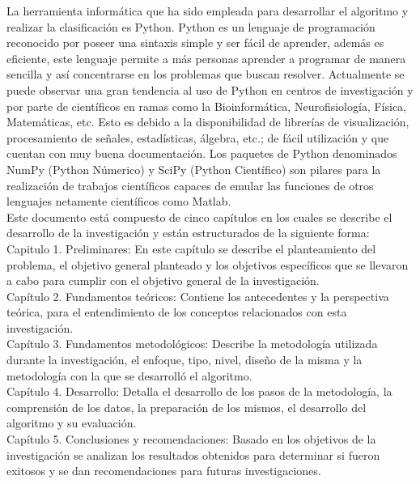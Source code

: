 La herramienta informática que ha sido empleada para desarrollar el algoritmo y realizar
la clasificación es Python. Python es un lenguaje de programación reconocido por poseer
una sintaxis simple y ser fácil de aprender, además es eficiente, este lenguaje permite
 a más personas aprender a programar de manera sencilla y así concentrarse en los
 problemas que buscan resolver. Actualmente se puede observar una gran tendencia al
 uso de Python en  centros de investigación y por parte de científicos en ramas como la Bioinformática,
  Neurofisiología, Física, Matemáticas, etc. Esto es debido a la disponibilidad de
  librerías de visualización, procesamiento de señales, estadísticas, álgebra, etc.;
  de fácil utilización y que cuentan con muy buena documentación. Los paquetes de
  Python denominados NumPy (Python Númerico) y SciPy (Python Científico) son pilares
  para la realización de trabajos científicos capaces de emular las funciones de otros
  lenguajes netamente científicos como Matlab.\\

Este documento está compuesto de cinco capítulos en los cuales se describe el desarrollo  de la
investigación y están estructurados de la siguiente forma:\\

Capitulo 1. Preliminares: En este capítulo se describe el planteamiento del problema,
el objetivo general planteado y los objetivos específicos que se llevaron a cabo para cumplir con el
objetivo general de  la investigación.\\

Capítulo 2. Fundamentos teóricos: Contiene los antecedentes y la perspectiva teórica, para el
entendimiento de los conceptos relacionados con esta investigación.\\

Capítulo 3. Fundamentos metodológicos: Describe la metodología utilizada durante la investigación, el
enfoque, tipo, nivel, dise\~no de la misma y la metodología con la que se desarrolló el algoritmo.\\

Capítulo 4. Desarrollo: Detalla el desarrollo de los pasos de la metodología, la
comprensión de los datos, la preparación de los mismos, el desarrollo del algoritmo y su
evaluación.\\

Capítulo 5. Conclusiones y recomendaciones: Basado en los objetivos de la investigación
se analizan los resultados obtenidos para determinar si fueron exitosos y se dan
recomendaciones para futuras investigaciones.\\

